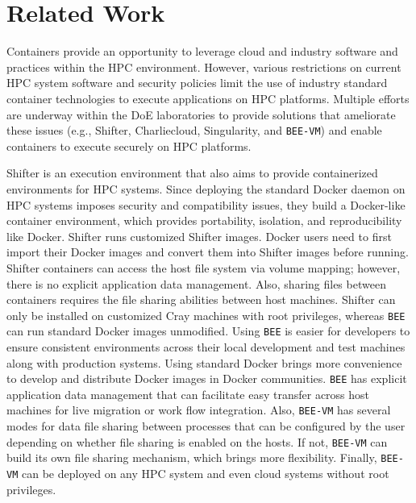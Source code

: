 \section{Related Work}
\label{sec:RelatedWork}
Containers provide an opportunity to leverage cloud and industry software and practices within the HPC environment. However, various restrictions on current HPC system software and security policies limit the use of industry standard container technologies to execute applications on HPC platforms. Multiple efforts are underway within the DoE laboratories to provide solutions that ameliorate these issues (e.g., Shifter\cite{jacobsen2015contain}, Charliecloud\cite{kurtzer_2016_60736}, Singularity\cite{priedhorsky2016charliecloud}, and \texttt{BEE-VM}) and enable containers to execute securely on HPC platforms. 

Shifter is an execution environment that also aims to provide containerized environments for HPC systems. Since deploying the standard Docker daemon on HPC systems imposes security and compatibility issues, they build a Docker-like container environment, which provides portability, isolation, and reproducibility like Docker. Shifter runs customized Shifter images. Docker users need to first import their Docker images and convert them into Shifter images before running. Shifter containers can access the host file system via volume mapping; however, there is no explicit application data management. Also, sharing files between containers requires the file sharing abilities between host machines. Shifter can only be installed on customized Cray machines with root privileges, whereas \texttt{BEE} can run standard Docker images unmodified. Using \texttt{BEE} is easier for developers to ensure consistent environments across their local development and test machines along with production systems. Using standard Docker brings more convenience to develop and distribute Docker images in Docker communities. \texttt{BEE} has explicit application data management that can facilitate easy transfer across host machines for live migration or work flow integration. Also, \texttt{BEE-VM} has several modes for data file sharing between processes that can be configured by the user depending on whether file sharing is enabled on the hosts. If not, \texttt{BEE-VM} can build its own file sharing mechanism, which brings more flexibility. Finally, \texttt{BEE-VM} can be deployed on any HPC system and even cloud systems without root privileges. 

